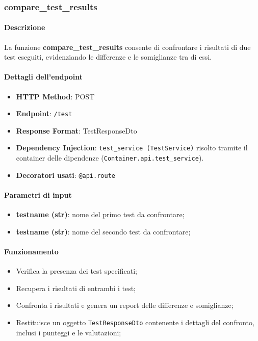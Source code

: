 \subsubsection{compare\_test\_results}
\label{subsubsec:comparetestresults}

\paragraph{Descrizione}
La funzione \textbf{compare\_test\_results} consente di confrontare i risultati di due test eseguiti, evidenziando le differenze e le somiglianze tra di essi.

\paragraph{Dettagli dell'endpoint}
\begin{itemize}
    \item \textbf{HTTP Method}: POST
    \item \textbf{Endpoint}: \texttt{/test}
    \item \textbf{Response Format}: TestResponseDto
    \item \textbf{Dependency Injection}: \texttt{test\_service (TestService)} risolto tramite il container delle dipendenze (\texttt{Container.api.test\_service}).
    \item \textbf{Decoratori usati}: \texttt{@api.route}
\end{itemize}

\paragraph{Parametri di input}
\begin{itemize}
    \item \textbf{testname (str)}: nome del primo test da confrontare;
    \item \textbf{testname (str)}: nome del secondo test da confrontare;
\end{itemize}

\paragraph{Funzionamento}
\begin{itemize}
    \item Verifica la presenza dei test specificati;
    \item Recupera i risultati di entrambi i test;
    \item Confronta i risultati e genera un report delle differenze e somiglianze;
    \item Restituisce un oggetto \texttt{TestResponseDto} contenente i dettagli del confronto, inclusi i punteggi e le valutazioni;
\end{itemize}

